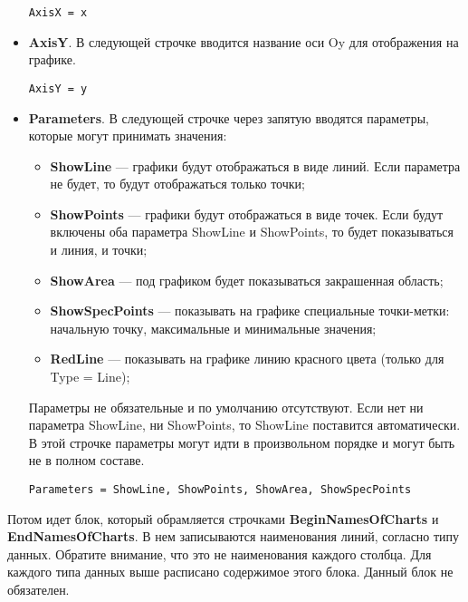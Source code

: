 \documentclass[a4paper,12pt]{article}
\begin{document}
\begin{itemize}
\begin{lstlisting}[label=Line04,caption=Название оси Ox]
AxisX = x
\end{lstlisting}

\item \textbf{AxisY}.
В следующей строчке вводится название оси Oy для отображения на графике.

\begin{lstlisting}[label=Line04,caption=Название оси Oy]
AxisY = y
\end{lstlisting}

\item \textbf{Parameters}.
В следующей строчке через запятую вводятся параметры, которые могут принимать значения:

\begin{itemize}
\item \textbf{ShowLine} --- графики будут отображаться в виде линий. Если параметра не будет, то будут отображаться только точки;
\item \textbf{ShowPoints} --- графики будут отображаться в виде точек. Если будут включены оба параметра ShowLine и ShowPoints, то будет показываться и линия, и точки;
\item \textbf{ShowArea} --- под графиком будет показываться закрашенная область;
\item \textbf{ShowSpecPoints} --- показывать на графике специальные точки-метки: начальную точку, максимальные и минимальные значения;
\item \textbf{RedLine} --- показывать на графике линию красного цвета (только для Type = Line);

\end{itemize}

Параметры не обязательные и по умолчанию отсутствуют. Если нет ни параметра ShowLine, ни ShowPoints, то ShowLine поставится автоматически. В этой строчке параметры могут идти в произвольном порядке и могут быть не в полном составе.

\begin{lstlisting}[label=Line04,caption=Строка параметров]
Parameters = ShowLine, ShowPoints, ShowArea, ShowSpecPoints
\end{lstlisting}

\end{itemize}

Потом идет блок, который обрамляется строчками \textbf{BeginNamesOfCharts} и \textbf{EndNamesOfCharts}. В нем записываются наименования линий, согласно типу данных. Обратите внимание, что это не наименования каждого столбца. Для каждого типа данных выше расписано содержимое этого блока. Данный блок не обязателен.
\end{document}
